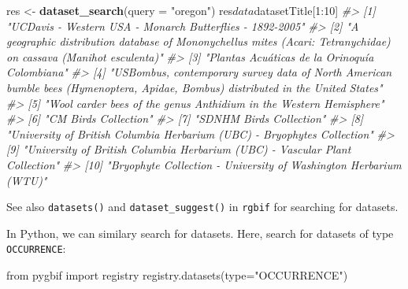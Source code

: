 \documentclass[author-year, review, 11pt]{components/elsarticle} %
\newenvironment{Shaded}{\begin{snugshade}}{\end{snugshade}}
\newcommand{\KeywordTok}[1]{\textcolor[rgb]{0.13,0.29,0.53}{\textbf{{#1}}}}
\newcommand{\DataTypeTok}[1]{\textcolor[rgb]{0.13,0.29,0.53}{{#1}}}
\newcommand{\DecValTok}[1]{\textcolor[rgb]{0.00,0.00,0.81}{{#1}}}
\newcommand{\CharTok}[1]{\textcolor[rgb]{0.31,0.60,0.02}{{#1}}}
\newcommand{\StringTok}[1]{\textcolor[rgb]{0.31,0.60,0.02}{{#1}}}
\newcommand{\CommentTok}[1]{\textcolor[rgb]{0.56,0.35,0.01}{\textit{{#1}}}}
\newcommand{\NormalTok}[1]{{#1}}
\begin{document}
\begin{Shaded}
\begin{Highlighting}[]
\NormalTok{res <-}\StringTok{ }\KeywordTok{dataset_search}\NormalTok{(}\DataTypeTok{query =} \StringTok{"oregon"}\NormalTok{)}
\NormalTok{res$data$datasetTitle[}\DecValTok{1}\NormalTok{:}\DecValTok{10}\NormalTok{]}
\CommentTok{#>  [1] "UCDavis - Western USA - Monarch Butterflies - 1892-2005"                                                                         }
\CommentTok{#>  [2] "A geographic distribution database of Mononychellus mites (Acari: Tetranychidae) on cassava (Manihot esculenta)"                 }
\CommentTok{#>  [3] "Plantas Acuáticas de la Orinoquía Colombiana"                                                                                    }
\CommentTok{#>  [4] "USBombus, contemporary survey data of North American bumble bees (Hymenoptera,  Apidae, Bombus) distributed in the United States"}
\CommentTok{#>  [5] "Wool carder bees of the genus Anthidium in the Western Hemisphere"                                                               }
\CommentTok{#>  [6] "CM Birds Collection"                                                                                                             }
\CommentTok{#>  [7] "SDNHM Birds Collection"                                                                                                          }
\CommentTok{#>  [8] "University of British Columbia Herbarium (UBC) - Bryophytes Collection"                                                          }
\CommentTok{#>  [9] "University of British Columbia Herbarium (UBC) - Vascular Plant Collection"                                                      }
\CommentTok{#> [10] "Bryophyte Collection - University of Washington Herbarium (WTU)"}
\end{Highlighting}
\end{Shaded}

See also \texttt{datasets()} and \texttt{dataset\_suggest()} in
\texttt{rgbif} for searching for datasets.

In Python, we can similary search for datasets. Here, search for
datasets of type \texttt{OCCURRENCE}:

\begin{Shaded}
\begin{Highlighting}[]
\CharTok{from} \NormalTok{pygbif }\CharTok{import} \NormalTok{registry}
\NormalTok{registry.datasets(}\DataTypeTok{type}\NormalTok{=}\StringTok{"OCCURRENCE"}\NormalTok{)}
\end{Highlighting}
\end{Shaded}
\end{document}
